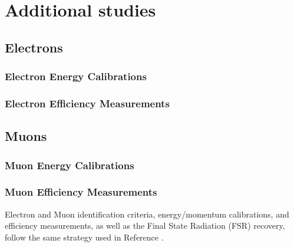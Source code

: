 \section{Additional studies}
\subsection{Electrons}
\subsubsection{Electron Energy Calibrations}

\subsubsection{Electron Efficiency Measurements}
\label{sec:eleEffMeas}


\subsection{Muons}
\subsubsection{Muon Energy Calibrations}

\subsubsection{Muon Efficiency Measurements}
\label{sec:muonEffMeas}

%

Electron and Muon identification criteria, energy/momentum calibrations, and efficiency measurements,
as well as the Final State Radiation (FSR) recovery, follow the same strategy used in Reference . %
